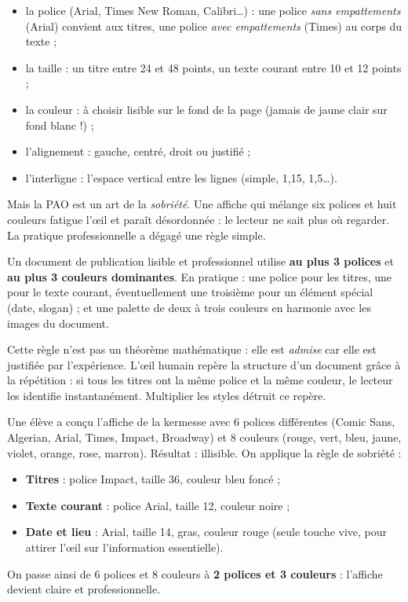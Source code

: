 \documentclass[11pt]{article}
\newcommand{\cle}[1]{{\popxbold\color{popdark}#1}}
\begin{document}
\begin{itemize}
\item la \cle{police} (Arial, Times New Roman, Calibri\ldots) : une police \emph{sans empattements} (Arial) convient aux titres, une police \emph{avec empattements} (Times) au corps du texte ;
\item la \cle{taille} : un titre entre 24 et 48 points, un texte courant entre 10 et 12 points ;
\item la \cle{couleur} : à choisir lisible sur le fond de la page (jamais de jaune clair sur fond blanc !) ;
\item l'\cle{alignement} : gauche, centré, droit ou justifié ;
\item l'\cle{interligne} : l'espace vertical entre les lignes (simple, 1,15, 1,5\ldots).
\end{itemize}

Mais la PAO est un art de la \emph{sobriété}. Une affiche qui mélange six polices et huit couleurs fatigue l'œil et paraît désordonnée : le lecteur ne sait plus où regarder. La pratique professionnelle a dégagé une règle simple.

\begin{propriete}
Un document de publication lisible et professionnel utilise \textbf{au plus 3 polices} et \textbf{au plus 3 couleurs dominantes}. En pratique : une police pour les titres, une pour le texte courant, éventuellement une troisième pour un élément spécial (date, slogan) ; et une palette de deux à trois couleurs en harmonie avec les images du document.
\end{propriete}

Cette règle n'est pas un théorème mathématique : elle est \emph{admise} car elle est justifiée par l'expérience. L'œil humain repère la structure d'un document grâce à la répétition : si tous les titres ont la même police et la même couleur, le lecteur les identifie instantanément. Multiplier les styles détruit ce repère.

\begin{exemplebox}
Une élève a conçu l'affiche de la kermesse avec 6 polices différentes (Comic Sans, Algerian, Arial, Times, Impact, Broadway) et 8 couleurs (rouge, vert, bleu, jaune, violet, orange, rose, marron). Résultat : illisible. On applique la règle de sobriété :
\begin{itemize}
\item \textbf{Titres} : police Impact, taille 36, couleur bleu foncé ;
\item \textbf{Texte courant} : police Arial, taille 12, couleur noire ;
\item \textbf{Date et lieu} : Arial, taille 14, gras, couleur rouge (seule touche vive, pour attirer l'œil sur l'information essentielle).
\end{itemize}
On passe ainsi de 6 polices et 8 couleurs à \textbf{2 polices et 3 couleurs} : l'affiche devient claire et professionnelle.
\end{exemplebox}
\end{document}
